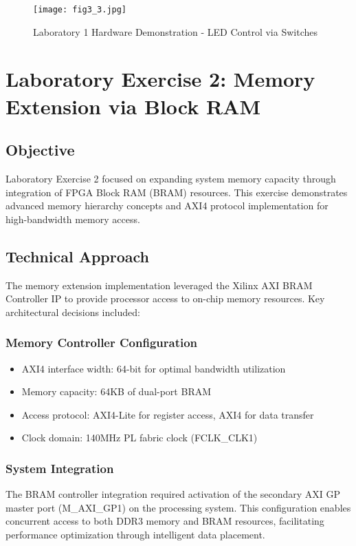 \documentclass[11pt,a4paper]{article}
\begin{document}
\begin{figure}[H]
    \centering
    \texttt{[image: fig3\_3.jpg]}
    \caption{Laboratory 1 Hardware Demonstration - LED Control via Switches}
    \label{fig:lab1_hardware}
\end{figure}

\section{Laboratory Exercise 2: Memory Extension via Block RAM}

\subsection{Objective}
Laboratory Exercise 2 focused on expanding system memory capacity through integration of FPGA Block RAM (BRAM) resources. This exercise demonstrates advanced memory hierarchy concepts and AXI4 protocol implementation for high-bandwidth memory access.

\subsection{Technical Approach}

The memory extension implementation leveraged the Xilinx AXI BRAM Controller IP to provide processor access to on-chip memory resources. Key architectural decisions included:

\subsubsection{Memory Controller Configuration}
\begin{itemize}[leftmargin=*]
    \item AXI4 interface width: 64-bit for optimal bandwidth utilization
    \item Memory capacity: 64KB of dual-port BRAM
    \item Access protocol: AXI4-Lite for register access, AXI4 for data transfer
    \item Clock domain: 140MHz PL fabric clock (FCLK\_CLK1)
\end{itemize}

\subsubsection{System Integration}
The BRAM controller integration required activation of the secondary AXI GP master port (M\_AXI\_GP1) on the processing system. This configuration enables concurrent access to both DDR3 memory and BRAM resources, facilitating performance optimization through intelligent data placement.
\end{document}
